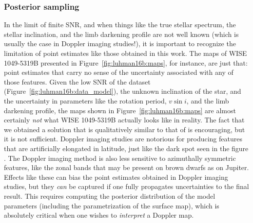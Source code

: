\documentclass[modern]{aastex631}
\begin{document}
\subsubsection{Posterior sampling}
\label{sec:discussion:priors:mcmc}
%
In the limit of finite SNR, and when things like the true stellar spectrum, the stellar inclination, and the limb darkening profile are not well known (which is usually the case in Doppler imaging studies!), it is important to recognize the limitation of point estimates like those obtained in this work.
The maps of WISE 1049-5319B presented in Figure~\ref{fig:luhman16b:maps}, for instance, are just that: point estimates that carry no sense of the uncertainty associated with any of those features.
Given the low SNR of the dataset (Figure~\ref{fig:luhman16b:data_model}), the unknown inclination of the star, and the uncertainty in parameters like the rotation period, $v\sin i$, and the limb darkening profile, the maps shown in Figure~\ref{fig:luhman16b:maps} are almost certainly \emph{not} what WISE 1049-5319B actually looks like in reality.
The fact that we obtained a solution that is qualitatively similar to that of \citet{Crossfield2014} is encouraging, but it is not sufficient.
Doppler imaging studies are notorious for producing features that are artificially elongated in latitude, just like the dark spot seen in the figure \citep[see, e.g.,][]{Unruh1995}.
The Doppler imaging method is also less sensitive to azimuthally symmetric features, like the zonal bands that may be present on brown dwarfs as on Jupiter.
Effects like these can bias the point estimates obtained in Doppler imaging studies, but they \emph{can} be captured if one fully propagates uncertainties to the final result.
This requires computing the posterior distribution of the model parameters (including the parametrization of the surface map), which is absolutely critical when one wishes to \emph{interpret} a Doppler map.
\end{document}
